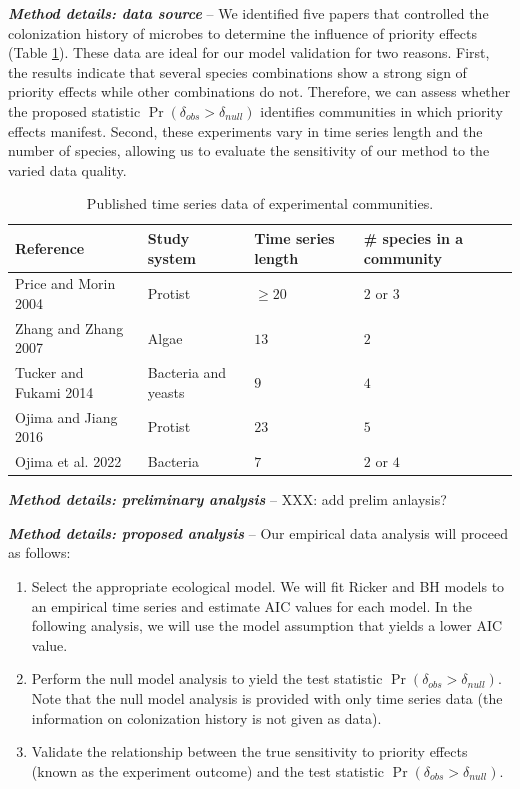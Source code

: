 \documentclass[12pt, class=article, crop=false]{standalone}
\begin{document}
\textit{\textbf{Method details: data source}} --
We identified five papers that controlled the colonization history of microbes to determine the influence of priority effects (Table \ref{tab:expdata}).
These data are ideal for our model validation for two reasons. First, the results indicate that several species combinations show a strong sign of priority effects while other combinations do not.
Therefore, we can assess whether the proposed statistic $\Pr(\delta_{obs} > \delta_{null})$ identifies communities in which priority effects manifest.
Second, these experiments vary in time series length and the number of species, allowing us to evaluate the sensitivity of our method to the varied data quality.


\begin{table}
    \flushleft
    \caption{Published time series data of experimental communities.}
    \begin{tabular}{llll}
         Reference & Study system & Time series length & \# species in a community\\
         \hline
         Price and Morin 2004 & Protist & $\ge 20$ & $2$ or $3$ \\
         Zhang and Zhang 2007 & Algae & $13$ & $2$\\
         Tucker and Fukami 2014 & Bacteria and yeasts & $9$ & $4$\\
         Ojima and Jiang 2016 & Protist & $23$ & $5$\\
         Ojima et al. 2022 & Bacteria & $7$ & $2$ or $4$\\
         \hline
    \end{tabular}
    \label{tab:expdata}
\end{table}

\textit{\textbf{Method details: preliminary analysis}} --
XXX: add prelim anlaysis?

\textit{\textbf{Method details: proposed analysis}} --
Our empirical data analysis will proceed as follows:

\begin{enumerate}
    \item Select the appropriate ecological model.
    We will fit Ricker and BH models to an empirical time series and estimate AIC values for each model.
    In the following analysis, we will use the model assumption that yields a lower AIC value.
    \item Perform the null model analysis to yield the test statistic $\Pr(\delta_{obs} > \delta_{null})$.
    Note that the null model analysis is provided with only time series data (the information on colonization history is not given as data).
    \item Validate the relationship between the true sensitivity to priority effects (known as the experiment outcome) and the test statistic $\Pr(\delta_{obs} > \delta_{null})$.
\end{enumerate}
\end{document}
